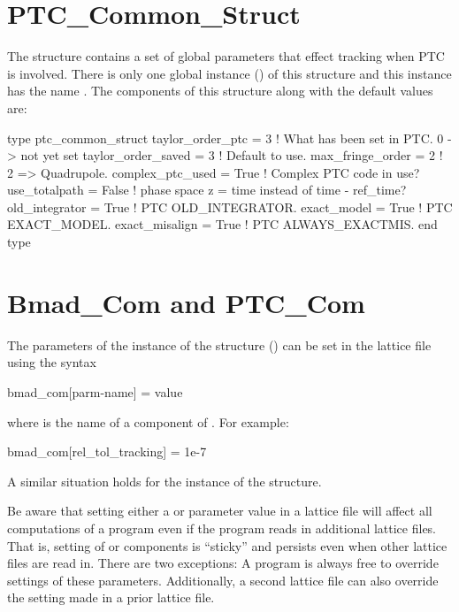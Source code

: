 {%
\section{PTC_Common_Struct}
\label{s:ptc.common}

The  structure contains a set of global parameters that effect tracking when
PTC is involved. There is only one global instance () of this structure and
this instance has the name . The components of this structure along with the default
values are:
\begin{example}
  type ptc_common_struct
    taylor_order_ptc = 3    ! What has been set in PTC. 0 -> not yet set
    taylor_order_saved = 3  ! Default to use.
    max_fringe_order  = 2   ! 2 => Quadrupole.
    complex_ptc_used = True ! Complex PTC code in use? 
    use_totalpath  = False  ! phase space z = time instead of time - ref_time?
    old_integrator = True   ! PTC OLD_INTEGRATOR.
    exact_model    = True   ! PTC EXACT_MODEL.
    exact_misalign = True   ! PTC ALWAYS_EXACTMIS.
  end type
\end{example}

\section{Bmad_Com and PTC_Com}
\label{s:bmad.ptc.com}

The parameters of the  instance of the  structure
() can be set in the lattice file using the syntax
\begin{example}
  bmad_com[parm-name] = value
\end{example}
where  is the name of a component of
. For example:
\begin{example}
  bmad_com[rel_tol_tracking] = 1e-7
\end{example}

A similar situation holds for the  instance of the  structure.

Be aware that setting either a  or  parameter value in a lattice file will
affect all computations of a program even if the program reads in additional lattice files. That is,
setting of  or  components is ``sticky'' and persists even when other
lattice files are read in. There are two exceptions: A program is always free to override settings
of these parameters.  Additionally, a second lattice file can also override the setting made in a
prior lattice file.

}
